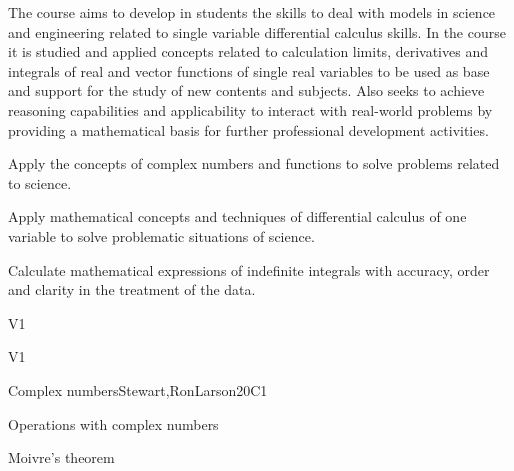 \begin{syllabus}


\begin{justification}
The course aims to develop in students the skills to deal with models in science and engineering related to single variable differential calculus skills. In the course it is studied and applied concepts related to calculation limits, derivatives and integrals of real and vector functions of single real variables to be used as base and support for the study of new contents and subjects. Also seeks to achieve reasoning capabilities and
applicability to interact with real-world problems by providing a mathematical basis for further professional development activities.
\end{justification}

\begin{goals}
\item Apply the concepts of complex numbers and functions to solve problems related to science.
\item Apply mathematical concepts and techniques of differential calculus of one variable to solve problematic situations of science.
\item Calculate mathematical expressions of indefinite integrals with accuracy, order and clarity in the treatment of the data.
\end{goals}

\begin{outcomes}{V1}
    \item {}
    \item {}
\end{outcomes}

\begin{competences}{V1}
    \item {}
    \item {}
    \item {}
\end{competences}

\begin{unit}{Complex numbers}{}{Stewart,RonLarson}{20}{C1}
   \begin{topics}
    \item Operations with complex numbers
    \item Moivre's theorem
   \end{topics}


\end{unit}
\end{syllabus}
